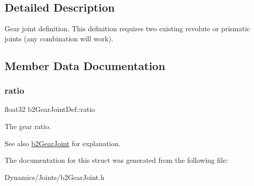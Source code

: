 \subsection{Detailed Description}
Gear joint definition. This definition requires two existing revolute or prismatic joints (any combination will work). 

\subsection{Member Data Documentation}
\mbox{\label{structb2GearJointDef_a57e9f4b6ce1ddc8b89b8455515f69323}} 
\subsubsection{\texorpdfstring{ratio}{ratio}}
{\footnotesize\ttfamily float32 b2\+Gear\+Joint\+Def\+::ratio}

The gear ratio. \begin{DoxySeeAlso}{See also}
\mbox{\hyperlink{classb2GearJoint}{b2\+Gear\+Joint}} for explanation. 
\end{DoxySeeAlso}


The documentation for this struct was generated from the following file\+:\begin{DoxyCompactItemize}
\item 
Dynamics/\+Joints/b2\+Gear\+Joint.\+h\end{DoxyCompactItemize}
